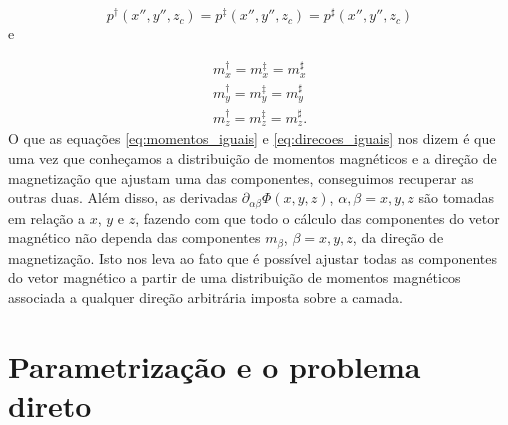 \begin{equation}
p^{\dagger}(x'', y'', z_{c}) = p^{\ddagger}(x'', y'', z_{c}) = p^{\sharp}(x'', y'', z_{c})
\label{eq:momentos_iguais}
\end{equation}
e 

\begin{equation}
\begin{split}
m_{x}^{\dagger} = m_{x}^{\ddagger} = m_{x}^{\sharp} \\
m_{y}^{\dagger} = m_{y}^{\ddagger} = m_{y}^{\sharp} \\
m_{z}^{\dagger} = m_{z}^{\ddagger} = m_{z}^{\sharp}.
\end{split}
\label{eq:direcoes_iguais}
\end{equation}
O que as equações \ref{eq:momentos_iguais} e \ref{eq:direcoes_iguais} nos dizem é que uma vez que conheçamos a distribuição de momentos magnéticos e a direção de magnetização que ajustam uma das componentes, conseguimos recuperar as outras duas. Além disso, as derivadas $\partial_{\alpha\beta} \Phi(x, y, z)$, $\alpha, \beta = x, y, z$ são tomadas em relação a $x$, $y$ e $z$, fazendo com que todo o cálculo das componentes do vetor magnético não dependa das componentes $m_\beta$, $\beta = x,y,z$, da direção de magnetização. Isto nos leva ao fato que é possível ajustar todas as componentes do vetor magnético a partir de uma distribuição de momentos magnéticos associada a qualquer direção arbitrária imposta sobre a camada.  
 
\section{Parametrização e o problema direto}

